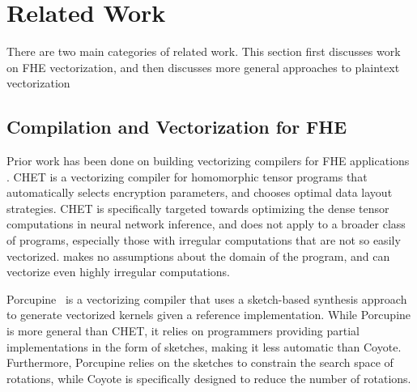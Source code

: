 \section{Related Work}\label{sec:related-work}
There are two main categories of related work. This section first discusses work on FHE vectorization, and then discusses more general approaches to plaintext vectorization 

\subsection{Compilation and Vectorization for FHE}
Prior work has been done on building vectorizing compilers for FHE applications \cite{CHET, Porcupine}.
CHET \cite{CHET} is a vectorizing compiler for homomorphic tensor programs that automatically selects encryption parameters, and chooses optimal data layout strategies.
CHET is specifically targeted towards optimizing the dense tensor computations in neural network inference, and does not apply to a broader class of programs, especially those with irregular computations that are not so easily vectorized.
\system makes no assumptions about the domain of the program, and can vectorize even highly irregular computations.

Porcupine~\cite{Porcupine} is a vectorizing compiler that uses a sketch-based synthesis approach to generate vectorized kernels given a reference implementation. While Porcupine is more general than CHET, it relies on programmers providing partial implementations in the form of sketches, making it less automatic than Coyote. Furthermore, Porcupine relies on the sketches to constrain the search space of rotations, while Coyote is specifically designed to reduce the number of rotations.

